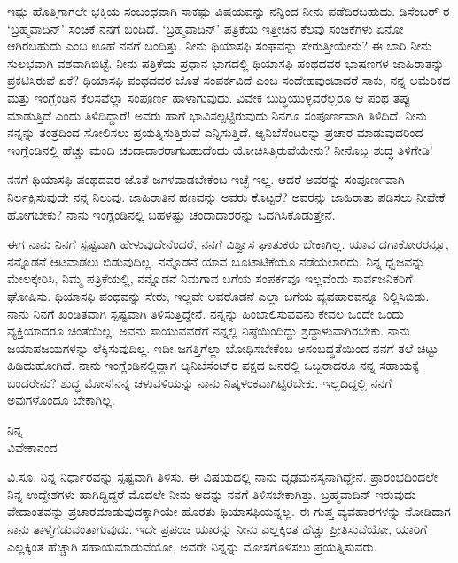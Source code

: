 \vspace{-0.5cm}

\begin{flushright}
{\fontsize{11.5pt}{11pt}\selectfont{೨೩ ನೇ ಜನವರಿ, ೧೮೯೬}}
\end{flushright}

ಇಷ್ಟು ಹೊತ್ತಿಗಾಗಲೇ ಭಕ್ತಿಯ ಸಂಬಂಧವಾಗಿ ಸಾಕಷ್ಟು ವಿಷಯವನ್ನು ನನ್ನಿಂದ ನೀನು ಪಡೆದಿರಬಹುದು. ಡಿಸೆಂಬರ್  ರ `ಬ್ರಹ್ಮವಾದಿನ್' ಸಂಚಿಕೆ ನನಗೆ ಬಂದಿದೆ. `ಬ್ರಹ್ಮವಾದಿನ್' ಪತ್ರಿಕೆಯ ಇತ್ತೀಚಿನ ಕೆಲವು ಸಂಚಿಕೆಗಳು ಏನೋ ಆಗಿರಬಹುದು ಎಂಬ ಊಹೆ ನನಗೆ ಬಂದಿತ್ತು. ನೀನು ಥಿಯಾಸಫಿ ಸಂಘವನ್ನು ಸೇರುತ್ತೀಯೇನು? ಈ ಬಾರಿ ನೀನು ಸುಲಭವಾಗಿ ವಶವಾಗಿಬಿಟ್ಟೆ. ನೀನು ಪತ್ರಿಕೆಯ ಪ್ರಧಾನ ಭಾಗದಲ್ಲಿ ಥಿಯಾಸಫಿ ಪಂಥದವರ ಭಾಷಣಗಳ ಜಾಹಿರಾತನ್ನು ಪ್ರಕಟಿಸಿರುವೆ ಏಕೆ? ಥಿಯಾಸಫಿ ಪಂಥದವರ ಜೊತೆ ಸಂಪರ್ಕವಿದೆ ಎಂಬ ಸಂದೇಹವುಂಟಾದರೆ ಸಾಕು, ನನ್ನ ಅಮೆರಿಕದ ಮತ್ತು ಇಂಗ್ಲೆಂಡಿನ ಕೆಲಸವೆಲ್ಲಾ ಸಂಪೂರ್ಣ ಹಾಳಾಗುವುದು. ವಿವೇಕ ಬುದ್ಧಿಯುಳ್ಳವರೆಲ್ಲರೂ ಆ ಪಂಥ ತಪ್ಪು ಮಾಡುತ್ತಿದೆ ಎಂದು ತಿಳಿದಿದ್ದಾರೆ! ಅವರು ಹಾಗೆ ಭಾವಿಸಲ್ಪಟ್ಟಿರುವುದು ನಿನಗೂ ಸಂಪೂರ್ಣವಾಗಿ ತಿಳಿದಿದೆ. ನೀನು ನನ್ನನ್ನು ತಂತ್ರದಿಂದ ಸೋಲಿಸಲು ಪ್ರಯತ್ನಿಸುತ್ತಿರುವೆ ಎನ್ನಿಸುತ್ತಿದೆ. ಆ್ಯನಿಬೆಸೆಂಟರನ್ನು ಪ್ರಚಾರ ಮಾಡುವುದರಿಂದ ಇಂಗ್ಲೆಂಡಿನಲ್ಲಿ ಹೆಚ್ಚು ಮಂದಿ ಚಂದಾದಾರರಾಗಬಹುದೆಂದು ಯೋಚಿಸಿತ್ತಿರುವೆಯೇನು? ನೀನೊಬ್ಬ ಶುದ್ಧ ತಿಳಿಗೇಡಿ!

ನನಗೆ ಥಿಯಾಸಫಿ ಪಂಥದವರ ಜೊತೆ ಜಗಳವಾಡಬೇಕೆಂಬ ಇಚ್ಛೆ ಇಲ್ಲ. ಆದರೆ ಅವರನ್ನು ಸಂಪೂರ್ಣವಾಗಿ ನಿರ್ಲಕ್ಷಿಸುವುದೇ ನನ್ನ ನಿಲುವು. ಜಾಹಿರಾತಿನ ಹಣವನ್ನು ಅವರು ಕೊಟ್ಟರೆ? ಅವರನ್ನು ಜಾಹಿರಾತು ಪಡಿಸಲು ನೀವೇಕೆ ಹೋಗಬೇಕು? ನಾನು ಇಂಗ್ಲೆಂಡಿನಲ್ಲಿ ಬಹಳಷ್ಟು ಚಂದಾದಾರರನ್ನು ಒದಗಿಸಿಕೊಡುತ್ತೇನೆ.

ಈಗ ನಾನು ನಿನಗೆ ಸ್ಪಷ್ಟವಾಗಿ ಹೇಳುವುದೇನೆಂದರೆ, ನನಗೆ ವಿಶ್ವಾಸ ಘಾತುಕರು ಬೇಕಾಗಿಲ್ಲ. ಯಾವ ದಗಾಕೋರರನ್ನೂ, ನನ್ನೊಡನೆ ಆಟವಾಡಲು ಬಿಡುವುದಿಲ್ಲ. ನನ್ನೊಡನೆ ಯಾವ ಬೂಟಾಟಿಕೆಯೂ ನಡೆಯಲಾರದು. ನಿನ್ನ ಧ್ವಜವನ್ನು ಮೇಲಕ್ಕೇರಿಸಿ, ನಿಮ್ಮ ಪತ್ರಿಕೆಯಲ್ಲಿ, ನನ್ನೊಡನೆ ನಿಮಗಾವ ಬಗೆಯ ಸಂಪರ್ಕವೂ ಇಲ್ಲವೆಂದು ಸಾರ್ವಜನಿಕರಿಗೆ ಘೋಷಿಸು. ಥಿಯಾಸಫಿ ಪಂಥವನ್ನು ಸೇರು, ಇಲ್ಲವೇ ಅವರೊಡನೆ ಎಲ್ಲಾ ಬಗೆಯ ವ್ಯವಹಾರವನ್ನೂ ನಿಲ್ಲಿಸಿಬಿಡು. ನಾನು ನಿನಗೆ ಖಂಡಿತವಾಗಿ ಸ್ಪಷ್ಟವಾಗಿ ತಿಳಿಸುತ್ತಿದ್ದೇನೆ. ನನ್ನನ್ನು ಹಿಂಬಾಲಿಸುವವನು ಕೇವಲ ಒಂದೇ ಒಂದು ವ್ಯಕ್ತಿಯಾದರೂ ಚಿಂತೆಯಿಲ್ಲ. ಅವನು ಸಾಯುವವರೆಗೆ ನನ್ನಲ್ಲಿ ನಿಷ್ಠೆಯಿಂದಿದ್ದು ಶ್ರದ್ಧಾಳುವಾಗಿರಬೇಕು. ನಾನು ಜಯಾ\break ಪಜಯಗಳನ್ನು ಲೆಕ್ಕಿಸುವುದಿಲ್ಲ. ಇಡೀ ಜಗತ್ತಿಗೆಲ್ಲಾ ಬೋಧಿಸಬೇಕೆಂಬ ಅಸಂಬದ್ಧತೆಯಿಂದ ನನಗೆ ತಲೆ ಚಿಟ್ಟು ಹಿಡಿದುಹೋಗಿದೆ. ನಾನು ಇಂಗ್ಲೆಂಡಿನಲ್ಲಿದ್ದಾಗ ಆ್ಯನಿಬೆಸೆಂಟ್‌ರ ಪಕ್ಷದ ಜನರಲ್ಲಿ ಒಬ್ಬರಾದರೂ ನನ್ನ ಸಹಾಯಕ್ಕೆ ಬಂದರೇನು? ಶುದ್ಧ ಮೋಸ!ನನ್ನ ಚಳುವಳಿಯನ್ನು ನಾನು ನಿಷ್ಕಳಂಕವಾಗಿಟ್ಟಿರಬೇಕು. ಇಲ್ಲದಿದ್ದಲ್ಲಿ ನನಗೆ ಅವುಗಳೊಂದೂ ಬೇಕಾಗಿಲ್ಲ.

\vspace{-0.5cm}

{\flushright
ನಿನ್ನ\\ವಿವೇಕಾನಂದ\par}

ವಿ.ಸೂ.\enginline{-} ನಿನ್ನ ನಿರ್ಧಾರವನ್ನು ಸ್ಪಷ್ಟವಾಗಿ ತಿಳಿಸು. ಈ ವಿಷಯದಲ್ಲಿ ನಾನು ದೃಢಮನಸ್ಕನಾಗಿದ್ದೇನೆ. ಪ್ರಾರಂಭದಿಂದಲೇ ನಿನ್ನ ಉದ್ದೇಶಗಳು ಹಾಗಿದ್ದಿದ್ದರೆ ಮೊದಲೇ ನೀನು ಅದನ್ನು ನನಗೆ ತಿಳಿಸಬೇಕಾಗಿತ್ತು. ಬ್ರಹ್ಮವಾದಿನ್ ಇರುವುದು ವೇದಾಂತವನ್ನು ಪ್ರಚಾರಮಾಡುವುದಕ್ಕಾಗಿಯೇ ಹೊರತು ಥಿಯಾಸಫಿಯನ್ನಲ್ಲ. ಈ ಗುಪ್ತ ವ್ಯವಹಾರಗಳನ್ನು ನೋಡಿದಾಗ ನಾನು ತಾಳ್ಮೆಗೆಡುವಂತಾಗುವುದು. ಇದೇ ಪ್ರಪಂಚ\enginline{-} ಯಾರನ್ನು ನೀನು ಎಲ್ಲಕ್ಕಿಂತ ಹೆಚ್ಚು ಪ್ರೀತಿಸುವೆಯೋ, ಯಾರಿಗೆ ಎಲ್ಲಕ್ಕಿಂತ ಹೆಚ್ಚಾಗಿ ಸಹಾಯಮಾಡುವೆಯೋ, ಅವರೇ ನಿನ್ನನ್ನು ಮೋಸಗೊಳಿಸಲು ಪ್ರಯತ್ನಿಸುವರು.

